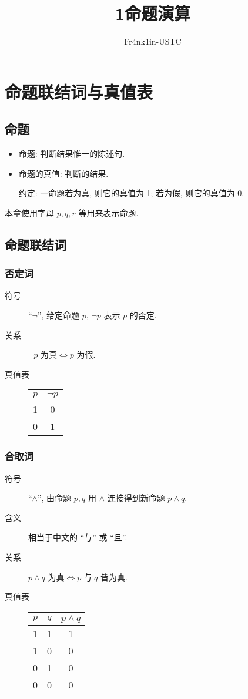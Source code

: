 \documentclass[
    mode=hazy,
    color=blue,
    device=normal,
    lang=cn
]{elegantnote}
\title{1\hspace{.5cm}命题演算}
\author{Fr4nk1in-USTC}
\institute{中国科学技术大学计算机学院}
\date{\zhtoday}
\begin{document}
\maketitle
\section{命题联结词与真值表}
\subsection{命题}
\begin{itemize}
    \item 命题: 判断结果惟一的陈述句.
    \item 命题的真值: 判断的结果.

          约定: 一命题若为真, 则它的真值为 1; 若为假, 则它的真值为 0.
\end{itemize}
本章使用字母 $p,q,r$ 等用来表示命题.
\subsection{命题联结词}
\subsubsection{否定词}
\begin{description}
    \item[符号] ``$\lnot$'', 给定命题 $p$, $\lnot p$ 表示 $p$ 的否定.
    \item[关系] $\lnot p\text{ 为真}\Leftrightarrow p\text{ 为假}$.
    \item[真值表]
        \begin{tabular}{c|c}
            $p$ & $\lnot p$ \\
            \hline
            1   & 0         \\
            0   & 1
        \end{tabular}
\end{description}
\subsubsection{合取词}
\begin{description}
    \item[符号] ``$\land$'', 由命题 $p,q$ 用 $\land$ 连接得到新命题 $p\land q$.
    \item[含义] 相当于中文的 ``与'' 或 ``且''.
    \item[关系] $p\land q\text{ 为真}\Leftrightarrow p\text{ 与}\ q\text{ 皆为真}$.
    \item[真值表]
        \begin{tabular}{c|c|c}
            $p$ & $q$ & $p\land q$ \\
            \hline
            1   & 1   & 1          \\
            1   & 0   & 0          \\
            0   & 1   & 0          \\
            0   & 0   & 0
        \end{tabular}
\end{description}
\end{document}
